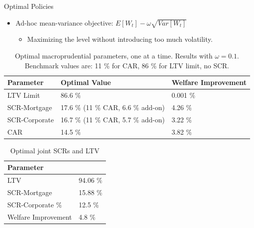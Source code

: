 \documentclass[8pt,aspectratio=169]{beamer}
\numberwithin{equation}{section}
\begin{document}
\begin{frame}{Optimal Policies}

\begin{itemize}
\item Ad-hoc mean-variance objective: $  E[W_t] - \omega \sqrt{Var[W_t]}  $
\begin{itemize}
\item Maximizing the level without introducing too much volatility.
\end{itemize}
\end{itemize}


\pause 
\begin{table}[h]

\caption{Optimal macroprudential parameters, one at a time. Results with $\omega=0.1$. 
Benchmark values are: 11 \% for CAR, 86 \% for LTV limit, no SCR. }
\begin{tabular}{l|l|l}

 \hline
 \hline
Parameter   &  Optimal Value & Welfare Improvement \\
\hline
\hline
LTV Limit&    86.6 \%  & 0.001 \%  \\

SCR-Mortgage &    17.6 \% (11 \% CAR, 6.6 \% add-on) & 4.26 \% \\

SCR-Corporate &    16.7 \% (11 \% CAR, 5.7 \% add-on) & 3.22 \% \\

CAR &    14.5 \% & 3.82 \% \\


\end{tabular}
\end{table}

\pause

\begin{table}[h]

\caption{Optimal joint SCRs and LTV}
\begin{tabular}{l|l}

 \hline
 \hline
Parameter  &  \\
\hline
\hline
LTV &    94.06 \%  \\

SCR-Mortgage      & 15.88 \%  \\

SCR-Corporate \%  & 12.5 \%  \\

Welfare Improvement  & 4.8 \% \\


\end{tabular}
\end{table}
\end{frame}
\end{document}
